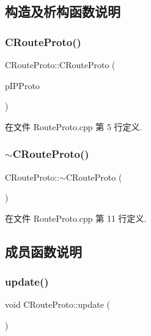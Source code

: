\subsection{构造及析构函数说明}
\mbox{\label{class_c_route_proto_a0af8908129d928acbadf7eba99d9b7e2}} 
\subsubsection{\texorpdfstring{C\+Route\+Proto()}{CRouteProto()}}
{\footnotesize\ttfamily C\+Route\+Proto\+::\+C\+Route\+Proto (\begin{DoxyParamCaption}\item[{\hyperlink{class_c_i_p_layer}{C\+I\+P\+Layer} $\ast$}]{p\+I\+P\+Proto }\end{DoxyParamCaption})}



在文件 Route\+Proto.\+cpp 第 5 行定义.

\mbox{\label{class_c_route_proto_ae53c5d97f132645a6f5cc32be66dcd7b}} 
\subsubsection{\texorpdfstring{$\sim$\+C\+Route\+Proto()}{~CRouteProto()}}
{\footnotesize\ttfamily C\+Route\+Proto\+::$\sim$\+C\+Route\+Proto (\begin{DoxyParamCaption}{ }\end{DoxyParamCaption})}



在文件 Route\+Proto.\+cpp 第 11 行定义.



\subsection{成员函数说明}
\mbox{\label{class_c_route_proto_ac17d99e82f088ed1b50426584c65b2d1}} 
\subsubsection{\texorpdfstring{update()}{update()}}
{\footnotesize\ttfamily void C\+Route\+Proto\+::update (\begin{DoxyParamCaption}{ }\end{DoxyParamCaption})}




